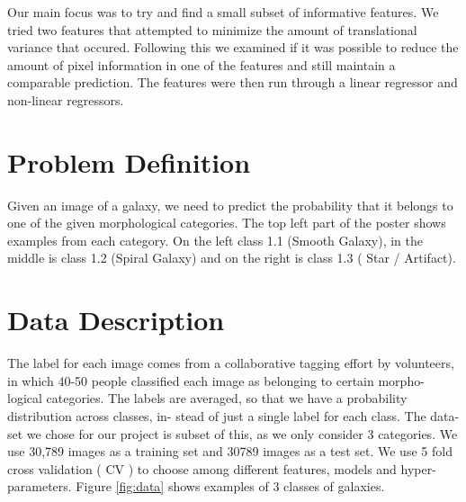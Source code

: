 \documentclass[10pt]{article}
\begin{document}
Our main focus was to try and find a small subset of informative features. We tried two features
that attempted to minimize the amount of translational variance that occured. Following this we
examined if it was possible to reduce the amount of pixel information in one of the features and
still maintain a comparable prediction. The features were then run through a linear regressor and
non-linear regressors.


\section*{Problem Definition}

Given an image of a galaxy, we need to predict the probability that it belongs to one of the given morphological categories. The top left part of the poster shows examples from each category. On the left class 1.1 (Smooth Galaxy), in the middle is class 1.2 (Spiral Galaxy) and on the right is class 1.3 ( Star / Artifact).

\section*{Data Description}

The label for each image comes from a collaborative tagging effort by volunteers, in which 40-50 people classified each image as belonging to certain morpho- logical categories. The labels are averaged, so that we have a probability distribution across classes, in- stead of just a single label for each class. The data- set we chose for our project is subset of this, as we only consider 3 categories. We use 30,789 images as a training set and 30789 images as a test set. We use 5 fold cross validation ( CV ) to choose among different features, models and hyper-parameters. Figure \ref{fig:data} shows examples of 3 classes of galaxies.  
\end{document}
